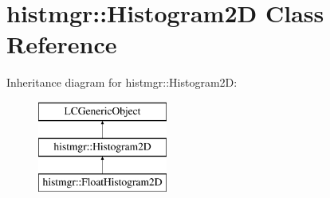\section{histmgr\-:\-:Histogram2\-D Class Reference}
\label{classhistmgr_1_1Histogram2D}
Inheritance diagram for histmgr\-:\-:Histogram2\-D\-:\begin{figure}[H]
\begin{center}
\leavevmode
\includegraphics[height=3.000000cm]{classhistmgr_1_1Histogram2D}
\end{center}
\end{figure}

